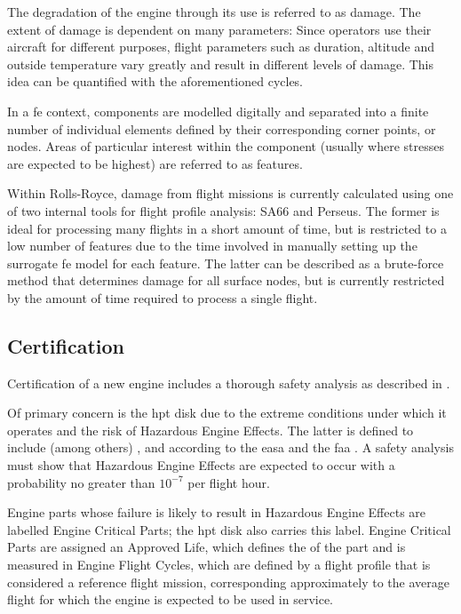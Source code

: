 The degradation of the engine through its use is referred to as damage. The extent of damage is dependent on many parameters: Since operators use their aircraft for different purposes, flight parameters such as duration, altitude and outside temperature vary greatly and result in different levels of damage. This idea can be quantified with the aforementioned cycles.

In a \ac{fe} context, components are modelled digitally and separated into a finite number of individual elements defined by their corresponding corner points, or nodes. Areas of particular interest within the component (usually where stresses are expected to be highest) are referred to as features.

Within Rolls-Royce, damage from flight missions is currently calculated using one of two internal tools for flight profile analysis: SA66 and Perseus. %
The former is ideal for processing many flights in a short amount of time, but is restricted to a low number of features due to the time involved in manually setting up the surrogate \ac{fe} model for each feature. The latter can be described as a brute-force method that determines damage for all surface nodes, but is currently restricted by the amount of time required to process a single flight.

\subsection{Certification}
Certification of a new engine includes a thorough safety analysis as described in \cite{easa_certification_2015}.

Of primary concern is the \ac{hpt} disk due to the extreme conditions under which it operates and the risk of Hazardous Engine Effects. The latter is defined to include (among others) ,  and  according to the \ac{easa} and the \ac{faa} \cite{easa_certification_2015, faa_guidance_2007}. A safety analysis must show that Hazardous Engine Effects are expected to occur with a probability no greater than \(10^{-7}\) per flight hour.

Engine parts whose failure is likely to result in Hazardous Engine Effects are labelled Engine Critical Parts; the \ac{hpt} disk also carries this label. Engine Critical Parts are assigned an Approved Life, which defines the  \cite{easa_certification_2015} of the part and is measured in Engine Flight Cycles, which are defined by a flight profile that is considered a reference flight mission, corresponding approximately to the average flight for which the engine is expected to be used in service.

